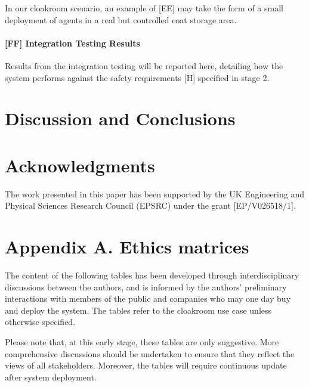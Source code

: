 \documentclass[lettersize,journal]{IEEEtran}
\begin{document}
In our cloakroom scenario, an example of [EE] may take the form of a small deployment of agents in a real but controlled coat storage area.




\paragraph*{[FF] Integration Testing Results}

Results from the integration testing will be reported here, detailing how the system performs against the safety requirements [H] specified in stage 2.

	
\section{Discussion and Conclusions} \label{discussion-conclusions}

\section*{Acknowledgments}
The work presented in this paper has been supported by the UK Engineering and Physical Sciences Research Council (EPSRC) under the grant [EP/V026518/1].




\appendices
\section*{Appendix A. Ethics matrices}
The content of the following tables has been developed through interdisciplinary discussions between the authors, and is informed by the authors’ preliminary interactions with members of the public and companies who may one day buy and deploy the system. The tables refer to the cloakroom use case unless otherwise specified. 

Please note that, at this early stage, these tables are only suggestive. More comprehensive discussions should be undertaken to ensure that they reflect the views of all stakeholders. Moreover, the tables will require continuous update after system deployment. 
\end{document}
